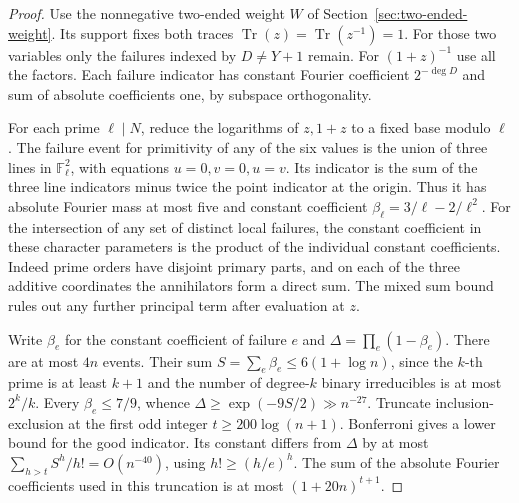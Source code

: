 \documentclass[11pt]{article}
\begin{document}
\begin{proof}
Use the nonnegative two-ended weight \(W\) of
Section~\ref{sec:two-ended-weight}. Its support fixes both traces
\(\operatorname{Tr}(z)=\operatorname{Tr}(z^{-1})=1\). For those two
variables only the failures indexed by \(D\ne Y+1\) remain.
For \((1+z)^{-1}\) use all the factors. Each failure indicator has
constant Fourier coefficient \(2^{-\deg D}\) and sum of absolute
coefficients one, by subspace orthogonality.

For each prime \(\ell\mid N\), reduce the logarithms of \(z,1+z\)
to a fixed base modulo \(\ell\). The failure event for primitivity
of any of the six values is the union of three lines in
\(\mathbb F_\ell^2\), with equations \(u=0,v=0,u=v\).
Its indicator is the sum of the three line indicators minus twice
the point indicator at the origin. Thus it has absolute Fourier
mass at most five and constant coefficient
\(\beta_\ell=3/\ell-2/\ell^2\).
For the intersection of any set of distinct local failures, the
constant coefficient in these character parameters is the product
of the individual constant coefficients. Indeed prime orders have
disjoint primary parts, and on each of the three additive coordinates
the annihilators form a direct sum. The mixed sum bound rules out
any further principal term after evaluation at \(z\).

Write \(\beta_e\) for the constant coefficient of failure \(e\) and
\(\Delta=\prod_e(1-\beta_e)\). There are at most \(4n\) events.
Their sum \(S=\sum_e\beta_e\le6(1+\log n)\), since the \(k\)-th prime
is at least \(k+1\) and the number of degree-\(k\) binary irreducibles
is at most \(2^k/k\). Every \(\beta_e\le7/9\), whence
\(\Delta\ge\exp(-9S/2)\gg n^{-27}\).
Truncate inclusion-exclusion at the first odd integer
\(t\ge200\log(n+1)\). Bonferroni gives a lower bound for the good
indicator. Its constant differs from \(\Delta\) by at most
\(\sum_{h>t}S^h/h!=O(n^{-40})\), using \(h!\ge(h/e)^h\).
The sum of the absolute Fourier coefficients used in this truncation
is at most \((1+20n)^{t+1}\).


\end{proof}
\end{document}
